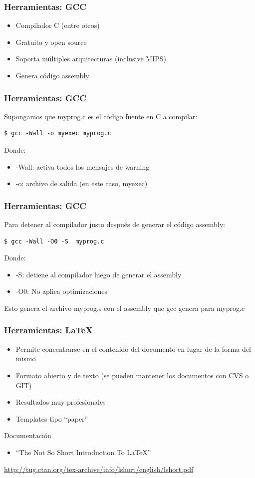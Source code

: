 \documentclass{beamer}
\begin{document}
 \begin{frame}
 \frametitle{Herramientas: GCC}
 \begin{itemize} 
    \item Compilador C (entre otros)
    \item Gratuito y open source
    \item Soporta múltiples arquitecturas (inclusive MIPS)
    \item Genera código assembly
  \end{itemize}
 \end{frame}
 
\begin{frame}[fragile]
 \frametitle{Herramientas: GCC}
 Supongamos que myprog.c es el código
fuente en C a compilar:
\begin{verbatim}
$ gcc -Wall -o myexec myprog.c
\end{verbatim}

Donde:
\begin{itemize}
 \item -Wall: activa todos los mensajes de warning
\item -o: archivo de salida (en este caso, myexec)
\end{itemize}
 \end{frame}
  
 
\begin{frame}[fragile]
 \frametitle{Herramientas: GCC}
Para detener al compilador justo
después de generar el código assembly:
\begin{verbatim}
$ gcc -Wall -O0 -S  myprog.c
\end{verbatim}

Donde:
\begin{itemize}
 \item -S: detiene al compilador luego de generar el assembly
\item -O0: No aplica optimizaciones
\end{itemize}

Esto genera el archivo myprog.s con el assembly
que gcc genera para myprog.c
 \end{frame}
  

 \begin{frame}
 \frametitle{Herramientas: \LaTeX}
 \begin{itemize} 
    \item Permite concentrarse en el contenido
del documento en lugar de la forma del
mismo
    \item Formato abierto y de texto (se pueden
mantener los documentos con CVS o GIT)
    \item Resultados muy profesionales
    \item Templates tipo “paper”
  \end{itemize}

  Documentación
  \begin{itemize}
   \item “The Not So Short Introduction To LaTeX”
  \end{itemize}
  \url{http://tug.ctan.org/tex-archive/info/lshort/english/lshort.pdf}
 \end{frame}
 
\end{document}
